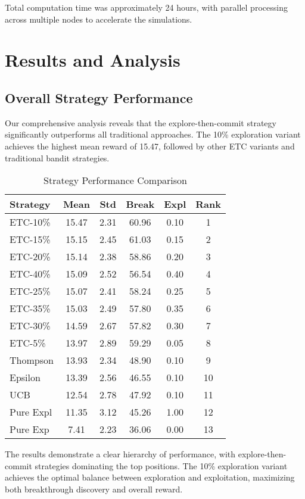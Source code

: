 \documentclass[letterpaper]{article} %
\begin{document}
Total computation time was approximately 24 hours, with parallel processing across multiple nodes to accelerate the simulations.

\section{Results and Analysis}

\subsection{Overall Strategy Performance}

Our comprehensive analysis reveals that the explore-then-commit strategy significantly outperforms all traditional approaches. The 10\% exploration variant achieves the highest mean reward of 15.47, followed by other ETC variants and traditional bandit strategies.

\begin{table}[t]
\centering
\begin{tabular}{lccccc}
\toprule
\textbf{Strategy} & \textbf{Mean} & \textbf{Std} & \textbf{Break} & \textbf{Expl} & \textbf{Rank} \\
\midrule
ETC-10\% & 15.47 & 2.31 & 60.96 & 0.10 & 1 \\
ETC-15\% & 15.15 & 2.45 & 61.03 & 0.15 & 2 \\
ETC-20\% & 15.14 & 2.38 & 58.86 & 0.20 & 3 \\
ETC-40\% & 15.09 & 2.52 & 56.54 & 0.40 & 4 \\
ETC-25\% & 15.07 & 2.41 & 58.24 & 0.25 & 5 \\
ETC-35\% & 15.03 & 2.49 & 57.80 & 0.35 & 6 \\
ETC-30\% & 14.59 & 2.67 & 57.82 & 0.30 & 7 \\
ETC-5\% & 13.97 & 2.89 & 59.29 & 0.05 & 8 \\
Thompson & 13.93 & 2.34 & 48.90 & 0.10 & 9 \\
Epsilon & 13.39 & 2.56 & 46.55 & 0.10 & 10 \\
UCB & 12.54 & 2.78 & 47.92 & 0.10 & 11 \\
Pure Expl & 11.35 & 3.12 & 45.26 & 1.00 & 12 \\
Pure Exp & 7.41 & 2.23 & 36.06 & 0.00 & 13 \\
\bottomrule
\end{tabular}
\caption{Strategy Performance Comparison}
\end{table}

The results demonstrate a clear hierarchy of performance, with explore-then-commit strategies dominating the top positions. The 10\% exploration variant achieves the optimal balance between exploration and exploitation, maximizing both breakthrough discovery and overall reward.
\end{document}
